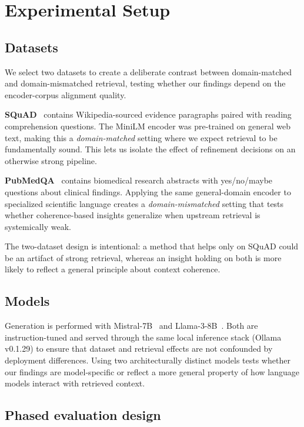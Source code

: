 \section{Experimental Setup}
\label{sec:setup}

\subsection{Datasets}

We select two datasets to create a deliberate contrast between domain-matched
and domain-mismatched retrieval, testing whether our findings depend on the
encoder-corpus alignment quality.

\textbf{SQuAD}~\citep{rajpurkar2016squad} contains Wikipedia-sourced evidence
paragraphs paired with reading comprehension questions. The MiniLM encoder
was pre-trained on general web text, making this a \emph{domain-matched}
setting where we expect retrieval to be fundamentally sound. This lets us
isolate the effect of refinement decisions on an otherwise strong pipeline.

\textbf{PubMedQA}~\citep{jin2019pubmedqa} contains biomedical research
abstracts with yes/no/maybe questions about clinical findings. Applying
the same general-domain encoder to specialized scientific language
creates a \emph{domain-mismatched} setting that tests whether
coherence-based insights generalize when upstream retrieval is
systemically weak.

The two-dataset design is intentional: a method that helps only on
SQuAD could be an artifact of strong retrieval, whereas an insight
holding on both is more likely to reflect a general principle about
context coherence.

\subsection{Models}

Generation is performed with Mistral-7B~\citep{jiang2023mistral} and
Llama-3-8B~\citep{llama3}. Both are instruction-tuned and served through the
same local inference stack (Ollama v0.1.29) to ensure that dataset and
retrieval effects are not confounded by deployment differences. Using two
architecturally distinct models tests whether our findings are
model-specific or reflect a more general property of how language models
interact with retrieved context.

\subsection{Phased evaluation design}

